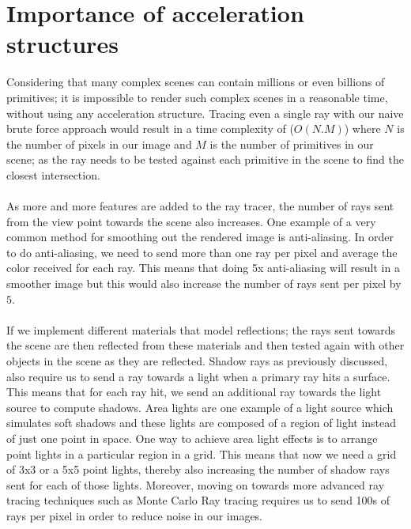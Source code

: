 \documentclass[11pt,a4paper]{article}
\begin{document}
\section{Importance of acceleration structures}
Considering that many complex scenes can contain millions or even billions of primitives; it is impossible to render such complex scenes in a reasonable time, without using any acceleration structure. Tracing even a single ray with our naive brute force approach would result in a time complexity of ($O(N.M)$) where $N$ is the number of pixels in our image and $M$ is the number of primitives in our scene; as the ray needs to be tested against each primitive in the scene to find the closest intersection. 
\\~\\
\noindent
As more and more features are added to the ray tracer, the number of rays sent from the view point towards the scene also increases. One example of a very common method for smoothing out the rendered image is anti-aliasing. In order to do anti-aliasing, we need to send more than one ray per pixel and average the color received for each ray. This means that doing 5x anti-aliasing will result in a smoother image but this would also increase the number of rays sent per pixel by $5$. 
\\~\\
\noindent
If we implement different materials that model reflections; the rays sent towards the scene are then reflected from these materials and then tested again with other objects in the scene as they are reflected. Shadow rays as previously discussed, also require us to send a ray towards a light when a primary ray hits a surface. This means that for each ray hit, we send an additional ray towards the light source to compute shadows. Area lights are one example of a light source which simulates soft shadows and these lights are composed of a region of light instead of just one point in space. One way to achieve area light effects is to arrange point lights in a particular region in a grid. This means that now we need a grid of 3x3 or a 5x5 point lights, thereby also increasing the number of shadow rays sent for each of those lights. Moreover, moving on towards more advanced ray tracing techniques such as Monte Carlo Ray tracing requires us to send 100s of rays per pixel in order to reduce noise in our images.
\\~\\
\noindent
\end{document}
